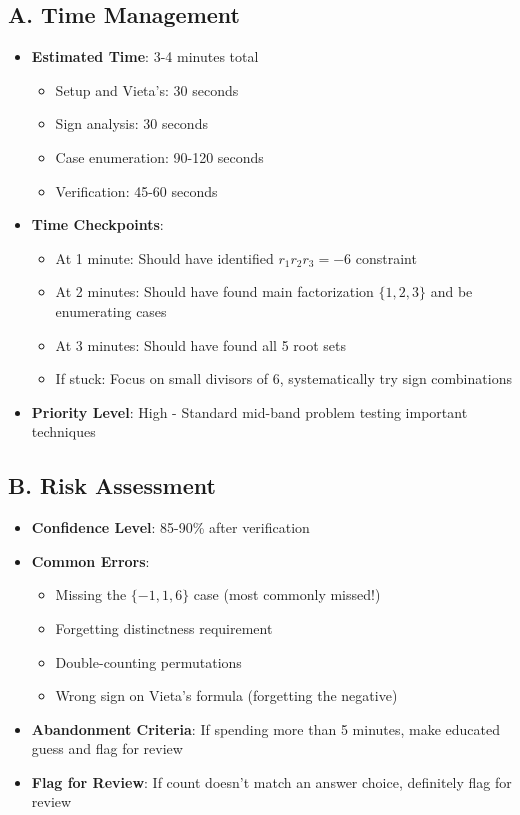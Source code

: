 \documentclass[12pt]{article}
\begin{document}
\begin{competitionbox}
\subsection*{A. Time Management}
\begin{itemize}[leftmargin=*]
    \item \textbf{Estimated Time}: 3-4 minutes total
    \begin{itemize}
        \item Setup and Vieta's: 30 seconds
        \item Sign analysis: 30 seconds
        \item Case enumeration: 90-120 seconds
        \item Verification: 45-60 seconds
    \end{itemize}
    \item \textbf{Time Checkpoints}: 
    \begin{itemize}
        \item At 1 minute: Should have identified $r_1 r_2 r_3 = -6$ constraint
        \item At 2 minutes: Should have found main factorization $\{1, 2, 3\}$ and be enumerating cases
        \item At 3 minutes: Should have found all 5 root sets
        \item If stuck: Focus on small divisors of 6, systematically try sign combinations
    \end{itemize}
    \item \textbf{Priority Level}: High - Standard mid-band problem testing important techniques
\end{itemize}

\subsection*{B. Risk Assessment}
\begin{itemize}[leftmargin=*]
    \item \textbf{Confidence Level}: 85-90\% after verification
    \item \textbf{Common Errors}:
    \begin{itemize}
        \item Missing the $\{-1, 1, 6\}$ case (most commonly missed!)
        \item Forgetting distinctness requirement
        \item Double-counting permutations
        \item Wrong sign on Vieta's formula (forgetting the negative)
    \end{itemize}
    \item \textbf{Abandonment Criteria}: If spending more than 5 minutes, make educated guess and flag for review
    \item \textbf{Flag for Review}: If count doesn't match an answer choice, definitely flag for review
\end{itemize}


\end{competitionbox}
\end{document}
